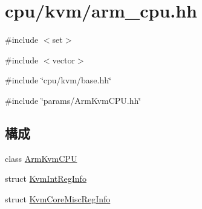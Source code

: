 \hypertarget{arm__cpu_8hh}{
\section{cpu/kvm/arm\_\-cpu.hh}
\label{arm__cpu_8hh}
}
{\ttfamily \#include $<$set$>$}\par
{\ttfamily \#include $<$vector$>$}\par
{\ttfamily \#include \char`\"{}cpu/kvm/base.hh\char`\"{}}\par
{\ttfamily \#include \char`\"{}params/ArmKvmCPU.hh\char`\"{}}\par
\subsection*{構成}
\begin{DoxyCompactItemize}
\item 
class \hyperlink{classArmKvmCPU}{ArmKvmCPU}
\item 
struct \hyperlink{structArmKvmCPU_1_1KvmIntRegInfo}{KvmIntRegInfo}
\item 
struct \hyperlink{structArmKvmCPU_1_1KvmCoreMiscRegInfo}{KvmCoreMiscRegInfo}
\end{DoxyCompactItemize}
